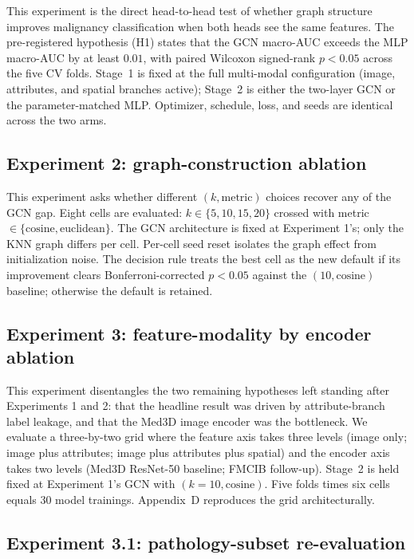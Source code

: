 \documentclass[10pt,letterpaper,twocolumn]{article}
\begin{document}
This experiment is the direct head-to-head test of whether graph structure improves malignancy classification when both heads see the same features. The pre-registered hypothesis (H1) states that the GCN macro-AUC exceeds the MLP macro-AUC by at least $0.01$, with paired Wilcoxon signed-rank $p < 0.05$ across the five CV folds. Stage~1 is fixed at the full multi-modal configuration (image, attributes, and spatial branches active); Stage~2 is either the two-layer GCN or the parameter-matched MLP. Optimizer, schedule, loss, and seeds are identical across the two arms.

\subsection{Experiment 2: graph-construction ablation}

This experiment asks whether different $(k, \text{metric})$ choices recover any of the GCN gap. Eight cells are evaluated: $k \in \{5, 10, 15, 20\}$ crossed with metric $\in \{\text{cosine}, \text{euclidean}\}$. The GCN architecture is fixed at Experiment 1's; only the KNN graph differs per cell. Per-cell seed reset isolates the graph effect from initialization noise. The decision rule treats the best cell as the new default if its improvement clears Bonferroni-corrected $p < 0.05$ against the $(10, \text{cosine})$ baseline; otherwise the default is retained.

\subsection{Experiment 3: feature-modality by encoder ablation}

This experiment disentangles the two remaining hypotheses left standing after Experiments 1 and 2: that the headline result was driven by attribute-branch label leakage, and that the Med3D image encoder was the bottleneck. We evaluate a three-by-two grid where the feature axis takes three levels (image only; image plus attributes; image plus attributes plus spatial) and the encoder axis takes two levels (Med3D ResNet-50 baseline; FMCIB follow-up). Stage~2 is held fixed at Experiment 1's GCN with $(k = 10, \text{cosine})$. Five folds times six cells equals 30 model trainings. Appendix~D reproduces the grid architecturally.

\subsection{Experiment 3.1: pathology-subset re-evaluation}
\end{document}
